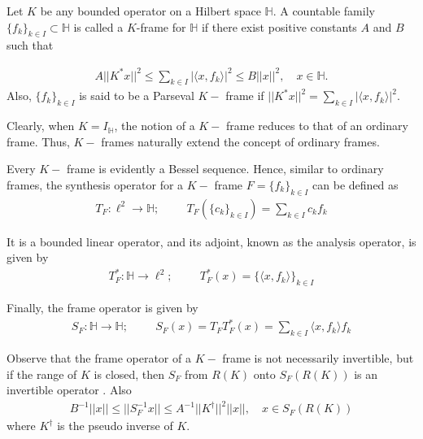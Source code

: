 \documentclass[a4paper,12pt,reqno]{amsart}
\theoremstyle{plain}
\theoremstyle{remark}
\begin{document}
	
	
	Let $K$ be any bounded operator on a Hilbert space $\mathbb{H}$. A countable family $\{f_k\}_{k\in I}\subset\mathbb{H}$ is called a $K$-frame for $\mathbb{H}$ if there exist positive constants $A$ and $B$ such that 
	
	\begin{align*}
		A||K^*x||^2\le\sum_{k\in I}|\langle x, f_k\rangle|^2\le B||x||^2, \quad x\in \mathbb{H}.
	\end{align*}
	Also, $\{f_k\}_{k\in I}$ is said to be a Parseval $K-$ frame if  $||K^*x||^2=\sum_{k\in I}|\langle x, f_k\rangle|^2$.
	
	Clearly, when $K=I_{\mathbb{H}}$, the notion of a $K-$ frame reduces to that of an ordinary frame. Thus, $K-$ frames naturally extend the concept of ordinary frames.
	
	Every $K-$ frame is evidently a Bessel sequence. Hence, similar to ordinary frames, the synthesis operator for a $K-$ frame $F= \{f_k\}_{k\in I}$ can be defined as
	\begin{align*}
		T_F:\ell^2 \to \mathbb{H} ; \hspace{1cm} T_F(\{c_k\}_{k\in I})= \sum_{k\in I}c_kf_k
	\end{align*}
	
	It is a bounded linear operator, and its adjoint, known as the analysis operator, is given by
	\begin{align*}
		T_F^* : \mathbb{H} \to \ell^2; \hspace{1cm} T_F^*(x)=\{\langle x,f_k \rangle\}_{k\in I}
	\end{align*}
	
	Finally, the frame operator is given by
	\begin{align*}
		S_F : \mathbb{H}\to \mathbb{H}; \hspace{1cm} S_F(x)= T_FT_F^*(x)= \sum_{k\in I}\langle x, f_k \rangle f_k
	\end{align*}
	
	Observe that the frame operator of a $K-$ frame is not necessarily invertible, but if the range of $K$ is closed, then $S_F$ from $R(K)$ onto $S_F(R(K))$ is an invertible operator \cite{d}.
	Also 
	\begin{align*}
		B^{-1}||x|| \leq ||S_F^{-1}x|| \leq A^{-1}||K^{\dagger}||^2 ||x||, \quad x\in S_F(R(K))
	\end{align*}
	where $K^{\dagger}$ is the pseudo inverse of $K$\cite{b}. 
	
\end{document}
